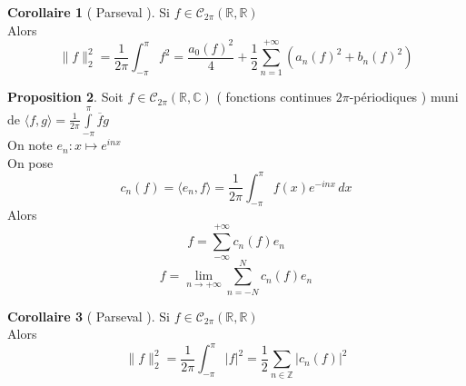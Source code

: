 \documentclass[10pt,a4paper]{article}
\theoremstyle{definition}
\newtheorem{proposition}{Proposition}[section]
\newtheorem{corollary}[proposition]{Corollaire}
\begin{document}
\pagebreak

\begin{corollary}[ Parseval ]
    Si \(f \in \mathcal{C}_{2\pi}(\mathbb{R}, \mathbb{R})\) \\
    Alors \[\boxed{\lVert f \rVert_2^2 = \frac{1}{2\pi}\int_{-\pi}^{\pi} f^2 = \frac{a_0(f)^2}{4} + \frac{1}{2} \sum_{n = 1}^{+\infty}\left(a_n(f)^2 + b_n(f)^2 \right)}\]
\end{corollary}
\begin{proposition}
    Soit \(f \in \mathcal{C}_{2\pi}(\mathbb{R}, \mathbb{C})\) ( fonctions continues \(2\pi\)-périodiques ) muni de \(\langle f, g \rangle = \frac{1}{2\pi}\int\limits_{-\pi}^{\pi}\overline{f}g\) \\
    On note \(e_n: x \mapsto e^{inx}\) \\
    On pose \[c_n(f) = \langle e_n, f \rangle = \frac{1}{2\pi} \int_{-\pi}^{\pi} f(x) e^{-inx} \,dx\]
    Alors \[\boxed{f = \sum_{-\infty}^{+\infty} c_n(f) e_n}\]
    \[ f = \lim_{n \to +\infty} \sum_{n = -N}^{N} c_n(f) e_n\]
\end{proposition}
\begin{corollary}[ Parseval ]
    Si \(f \in \mathcal{C}_{2\pi}(\mathbb{R}, \mathbb{R})\) \\
    Alors \[\boxed{\lVert f \rVert_2^2 = \frac{1}{2\pi}\int_{-\pi}^{\pi} |f|^2 = \frac{1}{2} \sum_{n \in \mathbb{Z}}|c_n(f)|^2}\]
\end{corollary}
\end{document}
